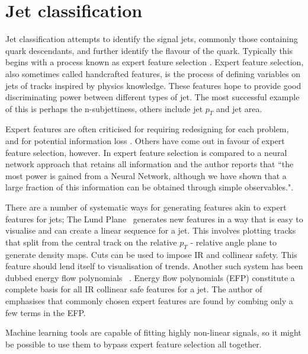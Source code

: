 \FloatBarrier
\section{Jet classification}\label{sec:jetclasification}
Jet classification attempts to identify the signal jets,
commonly those containing quark descendants,
and further identify the flavour of the quark.
Typically this begins with a process known as expert feature selection \cite{CMS_CSVDeepCSV13TeV, Schramm:2291608}.
Expert feature selection, also sometimes called handcrafted features, is the process of defining variables on jets of tracks inspired by physics knowledge.
These features hope to provide good discriminating power between different types of jet.
The most successful example of this is perhaps the n-subjettiness, others include jet \(p_T\) and jet area.

Expert features are often criticised for requiring redesigning for each problem, and for potential information loss \cite{cheng_recursive_2018, radovic_machine_2018}.
Others have come out in favour of expert feature selection, however. In \cite{Lin_boostingbbH2018} expert feature selection is compared to a neural network approach that retains all information and the author reports that ``the most power is gained from a Neural Network, although we have shown that a large fraction of this information can be obtained through simple observables.".

There are a number of systematic ways for generating features akin to expert features for jets;
The Lund Plane~\cite{Dreyer_LundPlane2018} generates new features in a way that is easy to visualise and can create a linear sequence for a jet.
This involves plotting tracks that split from the central track on the relative \(p_T\) - relative angle plane to generate density maps.
Cuts can be used to impose IR and collinear safety.
This feature should lend itself to visualisation of trends.
Another such system has been dubbed energy flow polynomials~ \cite{Komiske_flowPolynomials2018}.
Energy flow polynomials (EFP) constitute a complete basis for all IR collinear safe features for a jet.
The author of \cite{Komiske_flowPolynomials2018} emphasises that commonly chosen expert features are found by combing only a few terms in the EFP.

Machine learning tools are capable of fitting highly non-linear signals,
so it might be possible to use them to bypass expert feature selection all together.

